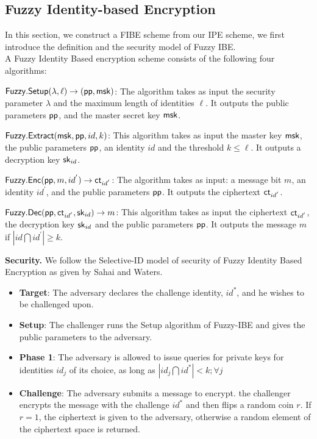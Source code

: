 \documentclass{llncs}
\begin{document}
\begin{appendix}
\section{Fuzzy Identity-based Encryption}
In this section, we construct a FIBE scheme from our IPE scheme, we first introduce the definition and the security model of Fuzzy IBE.\\[0.4cm]
A Fuzzy Identity Based encryption scheme consists of the following four algorithms:
\begin{description}
 \item $\mathsf{Fuzzy}.\mathsf{Setup}(\lambda, \ell)\rightarrow (\mathsf{pp}, \mathsf{msk})$: The algorithm takes as input the security parameter $\lambda$ and the maximum length of identities $\ell$. It outputs the public parameters $\mathsf{pp}$, and the master secret key $\mathsf{msk}$.
 \item $\mathsf{Fuzzy}.\mathsf{Extract}(\mathsf{msk}, \mathsf{pp}, id, k)$: This algorithm takes as input the master key $\mathsf{msk}$, the public parameters $\mathsf{pp}$, an identity $id$ and the threshold  $k\leq \ell$. It outputs a decryption key $\mathsf{sk}_{id}$.
 \item $\mathsf{Fuzzy}.\mathsf{Enc}(\mathsf{pp}, m, id^{'}) \rightarrow \mathsf{ct}_{id^{'}}$: The algorithm takes as input: a message bit $m$, an identity $id^{'}$, and the public parameters $\mathsf{pp}$. It outputs the ciphertext $\mathsf{ct}_{id^{'}}$.
 \item $\mathsf{Fuzzy}.\mathsf{Dec}(\mathsf{pp}, \mathsf{ct}_{id^{'}}, \mathsf{sk}_{id})\rightarrow m$: This algorithm takes as input the ciphertext $\mathsf{ct}_{id^{'}}$, the decryption key $\mathsf{sk}_{id}$ and the public parameters $\mathsf{pp}$. It outputs the message $m$ if $|id \bigcap id^{'}| \geq k$.
\end{description}
\textbf{Security.} We follow the Selective-ID model of security of Fuzzy Identity Based Encryption as given by Sahai and Waters\cite{EC:SahWat05}.
\begin{itemize}
 \item \textbf{Target}: The adversary declares the challenge identity, $id^{*}$, and he wishes to be challenged upon.
 \item \textbf{Setup}: The challenger runs the Setup algorithm of Fuzzy-IBE and gives the public parameters to the adversary.
 \item \textbf{Phase 1}: The adversary is allowed to issue queries for private keys for identities $id_{j}$ of its choice, as long as $|id_{j} \bigcap id^{*}|< k; \forall j$
 \item \textbf{Challenge}: The adversary submits a message to encrypt. the challenger encrypts the message with the challenge $id^{*}$ and then flips a random coin $r$. If $r=1$, the ciphertext is given to the adversary, otherwise a random element of the ciphertext space is returned.

\end{itemize}
\end{appendix}
\end{document}
